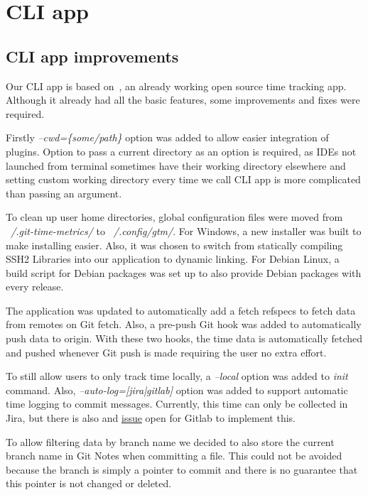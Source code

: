 \section{CLI app}\label{sec:cli-app-contents}

\subsection{CLI app improvements}\label{subsec:cli-app-improvements}
Our CLI app is based on~, an already working open source time tracking app.
Although it already had all the basic features, some improvements and fixes were required.

Firstly \textit{--cwd=\{some/path\}} option was added to allow easier integration of plugins.
Option to pass a current directory as an option is required, as IDEs not launched from terminal sometimes have their working
directory elsewhere and setting custom working directory every time we call CLI app is more complicated than passing an argument.

To clean up user home directories, global configuration files were moved from \textit{~/.git-time-metrics/} to \textit{~/.config/gtm/}.
For Windows, a new installer was built to make installing easier.
Also, it was chosen to switch from statically compiling SSH2 Libraries into our application to dynamic linking.
For Debian Linux, a build script for Debian packages was set up to also provide Debian packages with every release.

The application was updated to automatically add a fetch refspecs to fetch data from remotes on Git fetch.
Also, a pre-push Git hook was added to automatically push data to origin.
With these two hooks, the time data is automatically fetched and pushed whenever Git push is made requiring the user no extra effort.

To still allow users to only track time locally, a \textit{--local} option was added to \textit{init} command.
Also, \textit{--auto-log=[jira|gitlab]} option was added to support automatic time logging to commit messages.
Currently, this time can only be collected in Jira, but there is also and \href{https://gitlab.com/gitlab-org/gitlab/-/issues/16543}{issue}
open for Gitlab to implement this.\cite{gitlab-time-issue}

To allow filtering data by branch name we decided to also store the current branch name in Git Notes when committing a file.
This could not be avoided because the branch is simply a pointer to commit and there is no guarantee that this pointer is not changed or deleted.

